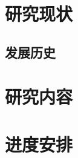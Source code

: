 \documentclass{article}
\begin{document}
\section{研究现状}
\lipsum[1]
\subsection{发展历史}
\lipsum[2]
\section{研究内容}
\lipsum[1-4]
\section{进度安排}
\lipsum[2]
\nocite{*}


\end{document}
